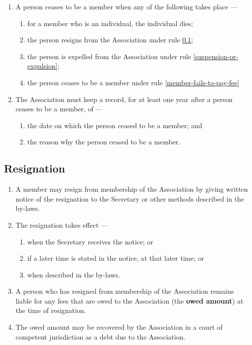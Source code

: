 \documentclass[../constitution.tex]{subfiles}
\begin{document}
\begin{enumerate}

\item A person ceases to be a member when any of the following takes place ---

  \begin{enumerate}
  
  \item for a member who is an individual, the individual dies; 
  \item the person resigns from the Association under rule \ref{resignation};
  \item the person is expelled from the Association under rule \ref{suspension-or-expulsion};
  \item the person ceases to be a member under rule \ref{member-fails-to-pay-fee}
  \end{enumerate}
\item The Association must keep a record, for at least one year after a person ceases to be a member, of ---

  \begin{enumerate}
  
  \item the date on which the person ceased to be a member; and
  \item the reason why the person ceased to be a member.
  \end{enumerate}
\end{enumerate}


\subsection{Resignation} \label{resignation}

\begin{enumerate}

\item A member may resign from membership of the Association by giving written notice of the resignation to the Secretary or other methods described in the by-laws. 
\item The resignation takes effect ---
  \begin{enumerate}
  \item when the Secretary receives the notice; or
  \item if a later time is stated in the notice, at that later time; or
  \item when described in the by-laws. 
  \end{enumerate}
\item A person who has resigned from membership of the Association remains liable for any fees that are owed to the Association (the \textbf{owed amount}) at the time of resignation.
\item The owed amount may be recovered by the Association in a court of competent jurisdiction as a debt due to the Association.
\end{enumerate}
\end{document}
